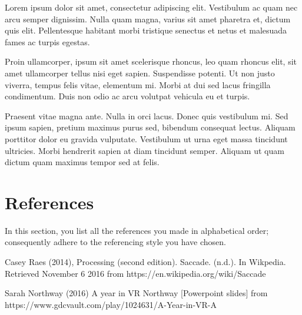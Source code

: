 \documentclass[12pt,a4paper]{report}
\newcommand{\daechapter}[1]{
  \chapter*{#1} %
  \addcontentsline{toc}{chapter}{#1} %
}
\begin{document}
Lorem ipsum dolor sit amet, consectetur adipiscing elit. Vestibulum ac quam nec arcu semper dignissim. Nulla quam magna, varius sit amet pharetra et, dictum quis elit. Pellentesque habitant morbi tristique senectus et netus et malesuada fames ac turpis egestas.

Proin ullamcorper, ipsum sit amet scelerisque rhoncus, leo quam rhoncus elit, sit amet ullamcorper tellus nisi eget sapien. Suspendisse potenti. Ut non justo viverra, tempus felis vitae, elementum mi. Morbi at dui sed lacus fringilla condimentum. Duis non odio ac arcu volutpat vehicula eu et turpis.

Praesent vitae magna ante. Nulla in orci lacus. Donec quis vestibulum mi. Sed ipsum sapien, pretium maximus purus sed, bibendum consequat lectus. Aliquam porttitor dolor eu gravida vulputate. Vestibulum ut urna eget massa tincidunt ultricies. Morbi hendrerit sapien at diam tincidunt semper. Aliquam ut quam dictum quam maximus tempor sed at felis.

\daechapter{References}

\begin{ybox}
In this section, you list all the references you made in alphabetical order; consequently adhere to the referencing style you have chosen.
\end{ybox}

Casey Raes (2014), Processing (second edition). Saccade. (n.d.). In Wikpedia. Retrieved November 6 2016 from https://en.wikipedia.org/wiki/Saccade

Sarah Northway (2016) A year in VR Northway [Powerpoint slides] from https://www.gdcvault.com/play/1024631/A-Year-in-VR-A
\end{document}
